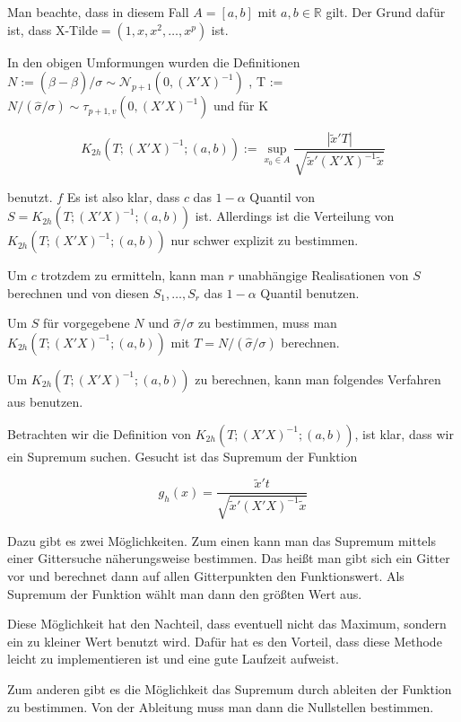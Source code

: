 \documentclass[12pt,a4paper]{article}
\theoremstyle{definition}
\theoremstyle{definition}
\theoremstyle{definition}
\theoremstyle{definition}
\begin{document}
Man beachte, dass in diesem Fall $A=[a,b]$ mit $a,b \in \mathbb{R}$ gilt. Der Grund dafür ist, dass \gls{X-Tilde}$ = (1, x, x^2, \ldots, x^p)$ ist.

In den obigen Umformungen wurden die Definitionen $ N := (\hat{\beta}-\beta)/\sigma \sim \mathscr{N}_{p+1
} (0,(X'X)^{-1}) $ , \gls{T} := $N/(\hat{\sigma}/\sigma)\sim\tau_{p+1,v}(0,(X'X)^{-1}) $ und für \gls{K}

\begin{equation*}
K_{2h}(T;(X'X)^{-1};(a,b)) := \sup_{x_{0} \in A} \frac{|\tilde{x}'T|}{\sqrt{\tilde{x}'(X'X)^{-1}\tilde{x}}}
\end{equation*}

benutzt.
$f$
Es ist also klar, dass $c$ das $1-\alpha$ Quantil von $S = K_{2h}(T;(X'X)^{-1};(a,b))$ ist. Allerdings ist die Verteilung von $K_{2h}(T;(X'X)^{-1};(a,b))$ nur schwer explizit zu bestimmen.

Um $c$ trotzdem zu ermitteln, kann man $r$ unabhängige Realisationen von $S$ berechnen und von diesen $S_1, \ldots, S_r$ das $1-\alpha$ Quantil benutzen.

Um $S$ für vorgegebene $N$ und $\hat{\sigma}/\sigma$ zu bestimmen, muss man $K_{2h}(T;(X'X)^{-1};(a,b))$ mit $T=N/(\hat{\sigma}/\sigma)$ berechnen. 

Um  $K_{2h}(T;(X'X)^{-1};(a,b))$ zu berechnen, kann man folgendes Verfahren aus \cite[Appendix E]{Liu64}  benutzen.

Betrachten wir die Definition von $K_{2h}(T;(X'X)^{-1};(a,b))$, ist klar, dass wir ein Supremum suchen. Gesucht ist das Supremum der Funktion 

\begin{equation*}
g_h(x) = \frac{\tilde{x}'t}{\sqrt{\tilde{x}'(X'X)^{-1}\tilde{x}}}
\end{equation*}

Dazu gibt es zwei Möglichkeiten. Zum einen kann man das Supremum mittels einer Gittersuche näherungsweise bestimmen. Das heißt man gibt sich ein Gitter vor und berechnet dann auf allen Gitterpunkten den Funktionswert. Als Supremum der Funktion wählt man dann den größten Wert aus.

Diese Möglichkeit hat den Nachteil, dass eventuell nicht das Maximum, sondern ein zu kleiner Wert benutzt wird. Dafür hat es den Vorteil, dass diese Methode leicht zu implementieren ist und eine gute Laufzeit aufweist. 

Zum anderen gibt es die Möglichkeit das Supremum durch ableiten der Funktion zu bestimmen. Von der Ableitung muss man dann die Nullstellen bestimmen.
\end{document}
